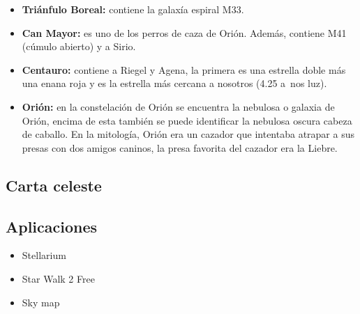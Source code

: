 \documentclass[10pt,a4paper]{article}
\begin{document}
\begin{itemize}
 \item \textbf{Triánfulo Boreal:} contiene la galaxía espiral M33.
 
 \item \textbf{Can Mayor:} es uno de los perros de caza de Orión. Además, contiene M41 (cúmulo abierto) y a Sirio.

 \item \textbf{Centauro:} contiene a Riegel y Agena, la primera es una estrella doble más una enana roja y es la estrella más cercana a nosotros (4.25 a~nos luz).
 
 \item \textbf{Orión:} en la constelación de Orión se encuentra la nebulosa o galaxia de Orión, encima de esta también se puede identificar la nebulosa oscura cabeza de caballo. En la mitología, Orión era un cazador que intentaba atrapar a sus presas con dos amigos caninos, la presa favorita del cazador era la Liebre.
 \end{itemize}
\subsection{Carta celeste}

\subsection{Aplicaciones}
\begin{itemize}
\item Stellarium
\item Star Walk 2 Free
\item Sky map
\end{itemize}
\end{document}
